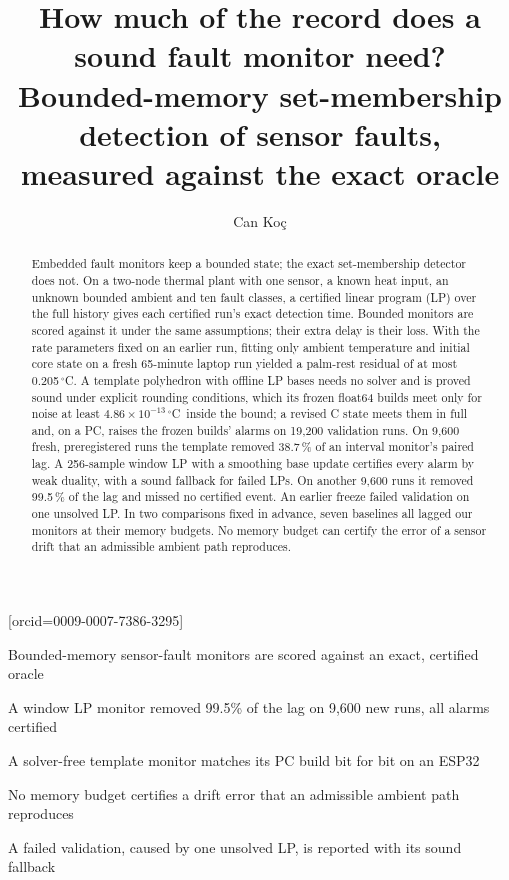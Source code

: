 \documentclass[a4paper,fleqn]{cas-dc}
\newcommand{\degC}{\ensuremath{{}^\circ}C}
\newcommand{\sci}[2]{\ensuremath{#1\times10^{#2}}}
\begin{document}
\let\WriteBookmarks\relax
\def\floatpagepagefraction{1}
\def\textpagefraction{.001}


\title[mode=title]{How much of the record does a sound fault monitor need? Bounded-memory set-membership detection
of sensor faults, measured against the exact oracle}

\author[1]{Can Ko\c{c}}[orcid=0009-0007-7386-3295]
\cormark[1]

\begin{abstract}
Embedded fault monitors keep a bounded state; the exact set-membership detector does not. On a two-node thermal plant
with one sensor, a known heat input, an unknown bounded ambient and ten fault classes, a certified linear
program (LP) over the full history gives each certified run's exact detection time. Bounded monitors are scored
against it under the same assumptions; their extra delay is their loss. With the rate parameters fixed on an earlier run, fitting only
ambient temperature and initial core state on a fresh 65-minute laptop run yielded a palm-rest residual of at most
0.205\,\degC. A template polyhedron with offline LP bases needs no solver and is proved sound under explicit rounding
conditions, which its frozen float64 builds meet only for noise at least \sci{4.86}{-13}\,\degC\ inside the bound; a
revised C state meets them in full and, on a PC, raises the frozen builds' alarms on 19,200 validation runs. On 9,600 fresh, preregistered runs the template removed 38.7\,\% of an interval monitor's paired lag. A
256-sample window LP with a smoothing base update certifies every alarm by weak duality, with a sound fallback for failed LPs. On another 9,600 runs it removed 99.5\,\% of the lag and missed no certified event.
An earlier freeze failed validation on one unsolved LP. In two comparisons fixed in advance, seven baselines all lagged our monitors at their memory budgets. No memory budget can certify the error of a sensor drift that an
admissible ambient path reproduces.
\end{abstract}

\begin{highlights}
\item Bounded-memory sensor-fault monitors are scored against an exact, certified oracle
\item A window LP monitor removed 99.5\% of the lag on 9,600 new runs, all alarms certified
\item A solver-free template monitor matches its PC build bit for bit on an ESP32
\item No memory budget certifies a drift error that an admissible ambient path reproduces
\item A failed validation, caused by one unsolved LP, is reported with its sound fallback
\end{highlights}
\end{document}
